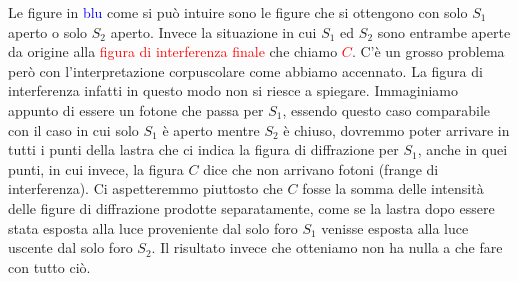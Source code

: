 \vspace{1em}
\begin{center}
\end{center}
\vspace{1em}
	
	Le figure in \textcolor{blue}{blu} come si può intuire sono le figure che si ottengono con solo $S_1$ aperto o solo $S_2$ aperto. Invece la situazione in cui $S_1$ ed $S_2$ sono entrambe aperte da origine alla \textcolor{red}{figura di interferenza finale} che chiamo \textcolor{red}{$C$}. C'è un grosso problema però con l'interpretazione corpuscolare come abbiamo accennato. La figura di interferenza infatti in questo modo non si riesce a spiegare. Immaginiamo appunto di essere un fotone che passa per $S_1$, essendo questo caso comparabile con il caso in cui solo $S_1$ è aperto mentre $S_2$ è chiuso, dovremmo poter arrivare in tutti i punti della lastra che ci indica la figura di diffrazione per $S_1$, anche in quei punti, in cui invece, la figura $C$ dice che non arrivano fotoni (frange di interferenza). Ci aspetteremmo piuttosto che $C$ fosse la somma delle intensità delle figure di diffrazione prodotte separatamente, come se la lastra dopo essere stata esposta alla luce proveniente dal solo foro $S_1$ venisse esposta alla luce uscente dal solo foro $S_2$. Il risultato invece che otteniamo non ha nulla a che fare con tutto ciò.
	
